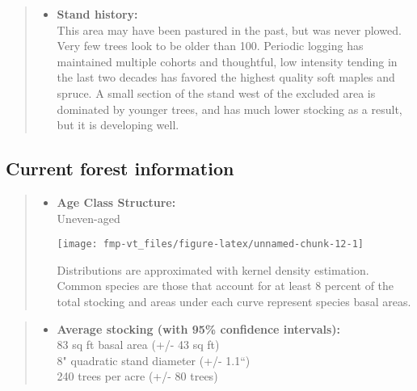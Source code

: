 \documentclass[]{tufte-handout}
\providecommand{\tightlist}{%
  \setlength{\itemsep}{0pt}\setlength{\parskip}{0pt}}
\begin{document}
\begin{quote}
\begin{itemize}
\tightlist
\item
  \textbf{Stand history:}\\
  \vspace{2pt} This area may have been pastured in the past, but was
  never plowed. Very few trees look to be older than 100. Periodic
  logging has maintained multiple cohorts and thoughtful, low intensity
  tending in the last two decades has favored the highest quality soft
  maples and spruce. A small section of the stand west of the excluded
  area is dominated by younger trees, and has much lower stocking as a
  result, but it is developing well.
\end{itemize}
\end{quote}

\subsection{Current forest
information}\label{current-forest-information-2}

\begin{quote}
\begin{itemize}
\tightlist
\item
  \textbf{Age Class Structure:}\\
  \vspace{2pt} Uneven-aged\\

  \begin{marginfigure}
  \texttt{[image: fmp-vt\_files/figure-latex/unnamed-chunk-12-1]} \caption[Distributions are approximated with kernel density estimation]{Distributions are approximated with kernel density estimation. Common species are those that account for at least 8 percent of the total stocking and areas under each curve represent species basal areas.}\label{fig:unnamed-chunk-12}
  \end{marginfigure}
\end{itemize}
\end{quote}

\begin{quote}
\begin{itemize}
\tightlist
\item
  \textbf{Average stocking (with 95\% confidence intervals):}\\
  \vspace{2pt} 83 sq ft basal area (+/- 43 sq ft)\\
  8" quadratic stand diameter (+/- 1.1``)\\
  240 trees per acre (+/- 80 trees)\\
  \vspace{8pt}
\end{itemize}
\end{quote}
\end{document}
